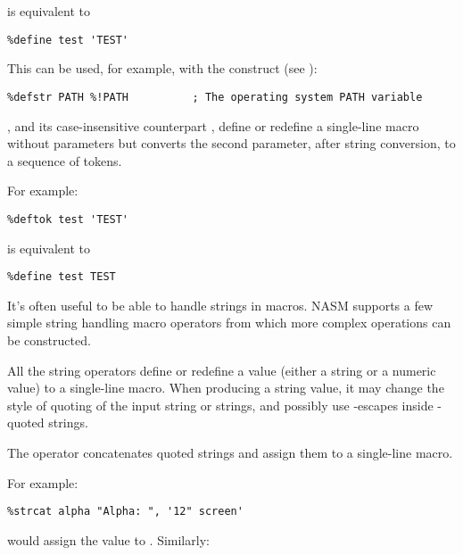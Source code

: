 is equivalent to

\begin{lstlisting}
%define test 'TEST'
\end{lstlisting}

This can be used, for example, with the \code{\%!} construct
(see ):

\begin{lstlisting}
%defstr PATH %!PATH          ; The operating system PATH variable
\end{lstlisting}


, and its case-insensitive counterpart ,
define or redefine a single-line macro without parameters but converts
the second parameter, after string conversion, to a sequence of tokens.

For example:

\begin{lstlisting}
%deftok test 'TEST'
\end{lstlisting}

is equivalent to

\begin{lstlisting}
%define test TEST
\end{lstlisting}


It's often useful to be able to handle strings in macros. NASM
supports a few simple string handling macro operators from which
more complex operations can be constructed.

All the string operators define or redefine a value (either a string
or a numeric value) to a single-line macro. When producing a string
value, it may change the style of quoting of the input string or
strings, and possibly use \code{\textbackslash}-escapes inside
-quoted strings.


The  operator concatenates quoted strings and assign
them to a single-line macro.

For example:

\begin{lstlisting}
%strcat alpha "Alpha: ", '12" screen'
\end{lstlisting}

would assign the value  to .
Similarly:

